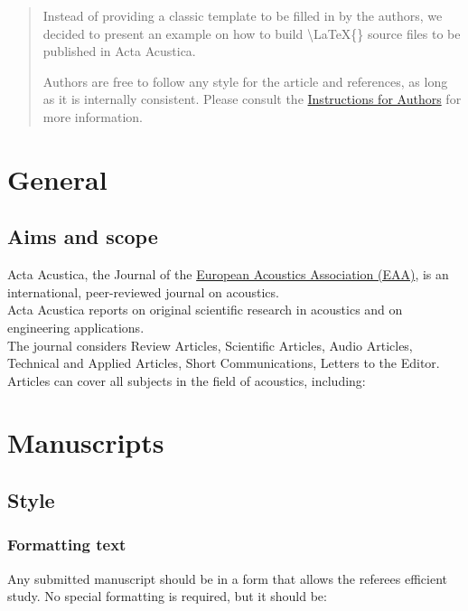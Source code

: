 \begin{abstract}
Instead of providing a classic template to be filled in by the authors,
we decided to present an example on how to build \textbackslash LaTeX\{\}
source files to be published in Acta Acustica. 

Authors are free to follow any style for the article and references,
as long as it is internally consistent. Please consult the \href{https://acta-acustica.edpsciences.org/author-information/instructions-for-authors}{Instructions for Authors}
for more information.
\end{abstract}

\section{General}

\subsection{Aims and scope }

Acta Acustica, the Journal of the \href{https://euracoustics.org/}{European Acoustics Association (EAA)},
is an international, peer-reviewed journal on acoustics. \\

Acta Acustica reports on original scientific research in acoustics
and on engineering applications.\\

The journal considers Review Articles, Scientific Articles, Audio
Articles, Technical and Applied Articles, Short Communications, Letters
to the Editor. Articles can cover all subjects in the field of acoustics,
including:


\section{Manuscripts}

\subsection{Style }

\subsubsection{Formatting text }

Any submitted manuscript should be in a form that allows the referees
efficient study. No special formatting is required, but it should
be:

